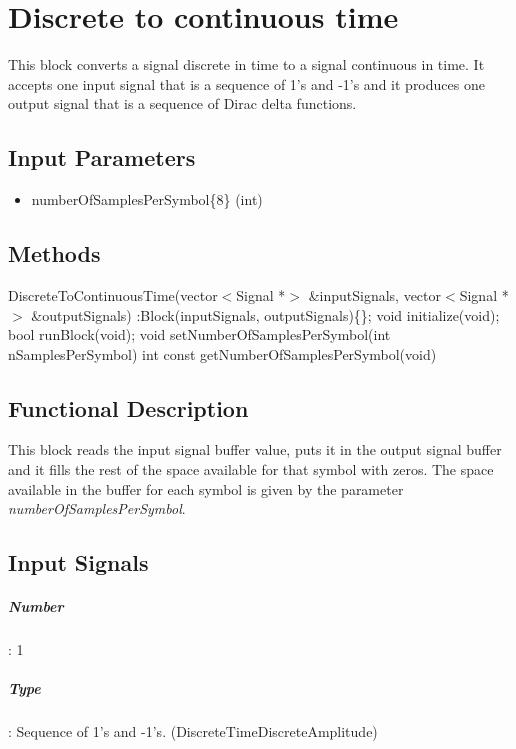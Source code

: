 \clearpage

\section{Discrete to continuous time}

This block converts a signal discrete in time to a signal continuous in time. It accepts one input signal that is a sequence of 1's and -1's and it produces one output signal that is a sequence of Dirac delta functions.

\subsection*{Input Parameters}

\begin{itemize}
	\item numberOfSamplesPerSymbol\{8\} \linebreak
	(int)
\end{itemize}

\subsection*{Methods}

DiscreteToContinuousTime(vector$<$Signal *$>$ \&inputSignals, vector$<$Signal *$>$ \&outputSignals) :Block(inputSignals, outputSignals)\{\};
\bigbreak	
void initialize(void);
\bigbreak	
bool runBlock(void);
\bigbreak	
void setNumberOfSamplesPerSymbol(int nSamplesPerSymbol)
\bigbreak
int const getNumberOfSamplesPerSymbol(void)

\subsection*{Functional Description}

This block reads the input signal buffer value, puts it in the output signal buffer and it fills the rest of the space available for that symbol with zeros. The space available in the buffer for each symbol is given by the parameter \textit{numberOfSamplesPerSymbol}.

\subsection*{Input Signals}

\subparagraph*{Number}: 1

\subparagraph*{Type}: Sequence of 1's and -1's. (DiscreteTimeDiscreteAmplitude)

